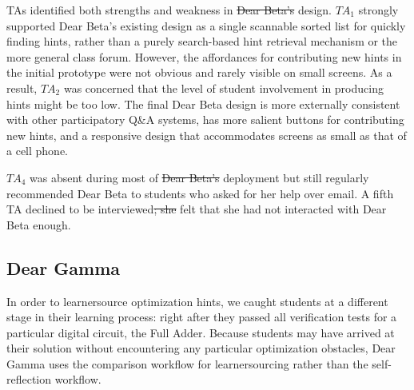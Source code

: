 \documentclass[12pt,twoside]{mitthesis}
\providecommand{\DIFaddtex}[1]{{\protect\color{blue}\uwave{#1}}} %
\providecommand{\DIFdeltex}[1]{{\protect\color{red}\sout{#1}}}                      %
\providecommand{\DIFaddbegin}{} %
\providecommand{\DIFaddend}{} %
\providecommand{\DIFdelbegin}{} %
\providecommand{\DIFdelend}{} %
\providecommand{\DIFadd}[1]{\texorpdfstring{\DIFaddtex{#1}}{#1}} %
\providecommand{\DIFdel}[1]{\texorpdfstring{\DIFdeltex{#1}}{}} %
\begin{document}
{{{{{{{{{{TAs identified both strengths and weakness in \DIFdelbegin \DIFdel{Dear Beta's }\DIFdelend \DIFaddbegin \DIFadd{the Dear Beta }\DIFaddend design. $TA_{1}$ strongly supported Dear Beta's existing design as a single scannable sorted list for quickly finding hints, rather than a purely search-based hint retrieval mechanism or the more general class forum. However, the affordances for contributing new hints in the initial prototype were not obvious and rarely visible on small screens. As a result, $TA_{2}$ was concerned that the level of student involvement in producing hints might be too low. The final Dear Beta design is more externally consistent with other participatory Q\&A systems, has more salient buttons for contributing new hints, and a responsive design that accommodates screens as small as that of a cell phone. 

$TA_{4}$ was absent during most of \DIFdelbegin \DIFdel{Dear Beta's }\DIFdelend \DIFaddbegin \DIFadd{the Dear Beta }\DIFaddend deployment but still regularly recommended Dear Beta to students who asked for her help over email. A fifth TA declined to be interviewed\DIFdelbegin \DIFdel{; she }\DIFdelend \DIFaddbegin \DIFadd{. She }\DIFaddend felt that she had not interacted with Dear Beta enough.

\subsection{Dear Gamma}

In order to learnersource optimization hints, we caught students at a different stage in their learning process: right after they passed all verification tests for a particular digital circuit, the Full Adder. Because students may have arrived at their solution without encountering any particular optimization obstacles, Dear Gamma uses the comparison workflow for learnersourcing rather than the self-reflection workflow. 

}}}}}}}}}}
\end{document}

